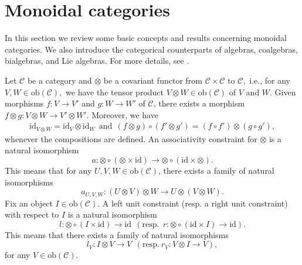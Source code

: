 \documentclass[11pt]{amsart}
\newcommand{\calC}{\mathcal{C}}
\newcommand{\ob}{\mathrm{ob}}
\newcommand{\id}{\mathrm{id}}
\theoremstyle{definition}
\numberwithin{equation}{section}
\begin{document}
		
		
\section{Monoidal categories}\label{pre}
In this section we review some basic concepts and results concerning monoidal categories. We also introduce the categorical counterparts of algebras, coalgebras, bialgebras, and Lie algebras. For more details, see \cite{Mac98,EGNO15}.
		
Let $\mathcal{C}$ be a category and $\otimes$ be a covariant functor from $\calC \times \calC$ to $\calC,$ i.e., for any $V,W\in \mathrm{ob}(\calC),$ we have the tensor product $V\otimes W \in \mathrm{ob}(\calC)$ of $V$ and $W$. Given morphisms $f: V \rightarrow V'$ and $g: W\rightarrow W'$ of $\calC$, there exists a morphism $f\otimes g: V\otimes W \rightarrow V'\otimes W'$. Moreover, we have 
\begin{align}\label{defoftensor}
	\mathrm{id}_{V\otimes W} = \mathrm{id}_V \otimes \mathrm{id}_W \ \  \mathrm{and} \ \ (f \otimes g) \circ (f'\otimes g')= (f\circ f') \otimes (g\circ g'),   
\end{align}
whenever the compositions are defined. 
An associativity constraint for $\otimes $ is a natural isomorphism 
\[a: \otimes \circ (\otimes \times \mathrm{id}) \rightarrow \otimes \circ ( \mathrm{id} \times \otimes). \]
This means that for any $U,V,W\in \mathrm{ob}(\calC)$, there exists a family of natural isomorphisms
\[a_{U,V,W}: (U\otimes V)\otimes W \rightarrow U\otimes (V\otimes W). \]
Fix an object $I \in \ob(\calC)$. A left unit constraint (resp. a right unit constraint) with respect to $I$ is a natural isomorphism 
\[l:\otimes \circ (I\times \id) \rightarrow \id \ \ (\mathrm{resp.} \ \ r: \otimes \circ (\id \times I) \rightarrow \id).  \]
This means that there exists a family of natural isomorphisms
\[l_V: I\otimes V \rightarrow V \ \ (\mathrm{resp.} \ r_V:V\otimes I \rightarrow V),  \]
for any $V\in \ob(\calC)$. 
		
\end{document}
